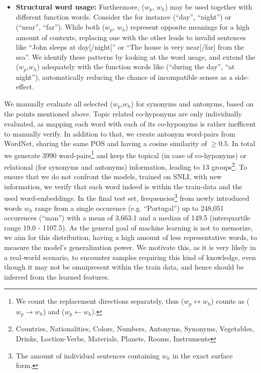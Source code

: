 \begin{itemize}
\item \textbf{Structural word usage:} Furthermore, ($w_p$, $w_h$) may be used together with different function words. Consider the for instance (``day'', ``night'') or (``near'', ``far''). While both ($w_p$, $w_h$) represent opposite meanings for a high amount of contexts, replacing one with the other leads to invalid sentences like ``John sleeps at day[/night]'' or ``The house is very near[/far] from the sea''. We identify these patterns by looking at the word usage, and extend the ($w_p$,$w_h$) adequately with the function words like (``during the day'', ``at night''), automatically reducing the chance of incompatible senses as a side-effect.
\end{itemize}
We manually evaluate all selected ($w_p$,$w_h$) for synonyms and antonyms, based on the points mentioned above. Topic related co-hyponyms are only individually evaluated, as mapping each word with each of its co-hyponyms is rather inefficent to manually verify. In addition to that, we create antonym word-pairs from WordNet, sharing the same \ac{POS} and having a cosine similarity of $\geq 0.5$. In total we generate 3990 word-pairs\footnote{We count the replacement directions separately, thus ($w_p \leftrightarrow w_h$) counts as ($w_p \rightarrow w_h$) and ($w_p \leftarrow w_h$).} and keep the topical (in case of co-hyponyms) or relational (for synonyms and antonyms) information, leading to 13 groups\footnote{Countries, Nationalities, Colors, Numbers, Antonyms, Synonyms, Vegetables, Drinks, Loction-Verbs, Materials, Planets, Rooms, Instruments}. To ensure that we do not confront the models, trained on \ac{SNLI}, with new information, we verify that each word indeed is within the train-data and the used word-embeddings. In the final test set, frequencies\footnote{The amount of individual sentences containing $w_h$ in the exact surface form.} from newly introduced words $w_h$ range from a single occurence (e.g. ``Portugal'') up to 248,051 occurences (``man'') with a mean of 3,663.1 and a median of 149.5 (interquartile range 19.0 - 1107.5). As the general goal of machine learning is not to memorize, we aim for this distribution, having a high amount of less representative words, to measure the model's generalization power. We motivate this, as it is very likely in a real-world scenario, to encounter samples requiring this kind of knowledge, even though it may not be omnipresent within the train data, and hence should be inferred from the learned features.

